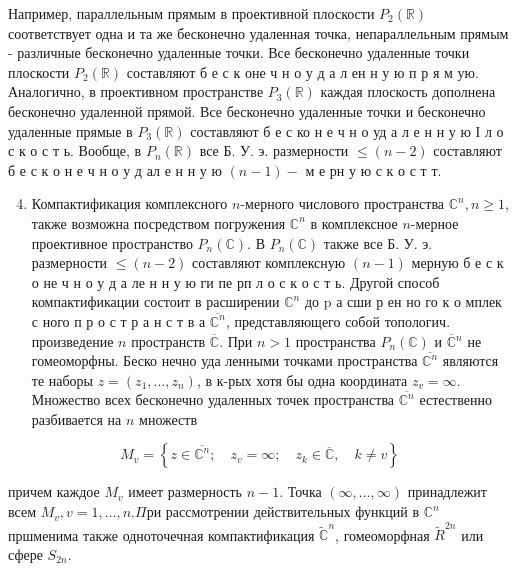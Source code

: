 \documentclass[10pt]{article}
\begin{document}
Например, параллельным прямым в проективной плоскости $P_{2}(\mathbb{R})$ соответствует одна и та же бесконечно удаленная точка, непараллельным прямым - различные бесконечно удаленные точки. Все бесконечно удаленные точки плоскости $P_{2}(\mathbb{R})$ составляют б е с к оне ч н о у д а л ен н у ю п р я м ую. Аналогично, в проективном пространстве $P_{3}(\mathbb{R})$ каждая плоскость дополнена бесконечно удаленной прямой. Все бесконечно удаленные точки и бесконечно удаленные прямые в $P_{3}(\mathbb{R})$ составляют б е с ко н е ч н о уд а л е н н у ю І л о с к о с т ь. Вообще, в $P_{n}(\mathbb{R})$ все Б. У. э. размерности $\leqslant(n-2)$ составляют б е с к о н е ч н о у д ал е н н у ю $(n-1)-$ м е рн у ю с к о с т т.



\begin{enumerate}

  \setcounter{enumi}{3}

  \item Компактификация комплексного $n$-мерного числового пространства $\mathbb{C}^{n}, n \geqslant 1$, также возможна посредством погружения $\mathbb{C}^{n}$ в комплексное $n$-мерное проективное пространство $P_{n}(\mathbb{C})$. В $P_{n}(\mathbb{C})$ также все Б. У. э. размерности $\leqslant(n-2)$ составляют комплексную $(n-1)$ мерную б е с к о не ч н о у д а ле н н у ю ги пе рп л о с к о с т ь. Другой способ компактификации состоит в расширении $\mathbb{C}^{n}$ до $\mathrm{p}$ а сши р ен но го к о мплек с ного п р о с т р а н с т в а $\overline{\mathbb{C}^{n}}$, представляющего собой топологич. произведение $n$ пространств $\overline{\mathbb{C}}$. При $n>1$ пространства $P_{n}(\mathbb{C})$ и $\overline{\mathbb{C}}{ }^{n}$ не гомеоморфны. Беско нечно уда ленными точками пространства $\overline{\mathbb{C}^{n}}$ являются те наборы $z=\left(z_{1}, \ldots, z_{n}\right)$, в к-рых хотя бы одна координата $z_{v}=\infty$. Множество всех бесконечно удаленных точек пространства $\overline{\mathbb{C}^{n}}$ естественно разбивается на $n$ множеств

\end{enumerate}



\[

M_{v}=\left\{z \in \overline{\mathbb{C}^{n}} ; \quad z_{v}=\infty ; \quad z_{k} \in \overline{\mathbb{C}}, \quad k \neq v\right\}

\]



причем каждое $M_{v}$ имеет размерность $n-1$. Точка $(\infty, \ldots, \infty)$ принадлежит всем $M_{v}, v=1, \ldots, n . \Pi р и$ рассмотрении действительных функций в $\mathbb{C}^{n}$ пршменима также одноточечная компактификация $\widetilde{\mathbb{C}}^{n}$, гомеоморфная $\widetilde{R}^{2 n}$ или сфере $S_{2 n}$.
\end{document}
